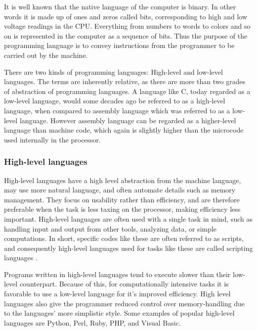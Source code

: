 	It is well known that the native language of the computer is
        binary. In other words it is made up of ones and zeros called
        bits, corresponding to high and low voltage readings in the
        CPU. Everything from numbers to words to colors and so on is
        represented in the computer as a sequence of bits. Thus the
        purpose of the programming language is to convey instructions
        from the programmer to be carried out by the machine.

	There are two kinds of programming languages: High-level and low-level languages. The terms are inherently relative, as there are more than two grades of abstraction of programming languages. A language like C, today regarded as a low-level language, would some decades ago be referred to as a high-level language, when compared to assembly language which was referred to as a low-level language. However assembly language can be regarded as a higher-level language than machine code, which again is slightly higher than the microcode used internally in the processor.

	\subsubsection{High-level languages}
		High-level languages have a high level abstraction
                from the machine language, may use more natural
                language, and often automate details such as memory
                management. They focus on usability rather than
                efficiency, and are therefore preferable when the task
                is less taxing on the processor, making efficiency
                less important. High-level languages are often used
                with a single task in mind, such as handling input and
                output from other tools, analyzing data, or simple
                computations. In short, specific codes like these are
                often referred to as scripts, and consequently
                high-level languages used for tasks like these are
                called scripting languages
                \cite{langtangen2006python}.

		Programs written in high-level languages tend to execute slower than their low-level counterpart. Because of this, for computationally intensive tasks it is favorable to use a low-level language for it's improved efficiency. High level languages also give the programmer reduced control over memory-handling due to the languages' more simplistic style. Some examples of popular high-level languages are Python, Perl, Ruby, PHP, and Visual Basic.

